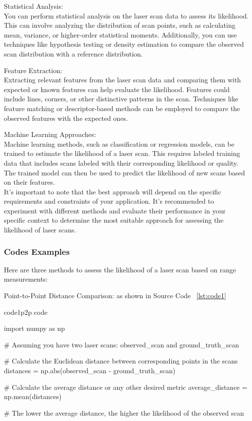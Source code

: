 \documentclass[]{article}
\begin{document}
Statistical Analysis: 
\\
You can perform statistical analysis on the laser scan data to assess its likelihood. This can involve analyzing the distribution of scan points, such as calculating mean, variance, or higher-order statistical moments. Additionally, you can use techniques like hypothesis testing or density estimation to compare the observed scan distribution with a reference distribution.

Feature Extraction: 
\\
Extracting relevant features from the laser scan data and comparing them with expected or known features can help evaluate the likelihood. Features could include lines, corners, or other distinctive patterns in the scan. Techniques like feature matching or descriptor-based methods can be employed to compare the observed features with the expected ones.

Machine Learning Approaches: 
\\
Machine learning methods, such as classification or regression models, can be trained to estimate the likelihood of a laser scan. This requires labeled training data that includes scans labeled with their corresponding likelihood or quality. The trained model can then be used to predict the likelihood of new scans based on their features.
\\
It's important to note that the best approach will depend on the specific requirements and constraints of your application. It's recommended to experiment with different methods and evaluate their performance in your specific context to determine the most suitable approach for assessing the likelihood of laser scans.

\subsubsection*{Codes Examples}

Here are three methods to assess the likelihood of a laser scan based on range measurements:

Point-to-Point Distance Comparison:
as shown in Source Code ~\ref{lst:code1}
\\


\begin{pythoncode}{code1}{p2p code}
	
import numpy as np

# Assuming you have two laser scans: observed_scan and ground_truth_scan

# Calculate the Euclidean distance between corresponding points in the scans
distances = np.abs(observed_scan - ground_truth_scan)

# Calculate the average distance or any other desired metric
average_distance = np.mean(distances)

# The lower the average distance, the higher the likelihood of the observed scan
\end{pythoncode}
\end{document}
